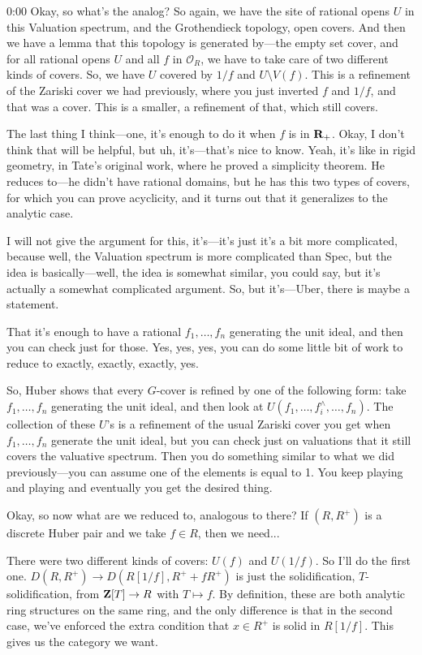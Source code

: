 \begin{unfinished}{0:00}
Okay, so what's the analog? So again, we have the site of rational opens $U$ in this Valuation spectrum, and the Grothendieck topology, open covers. And then we have a lemma that this topology is generated by---the empty set cover, and for all rational opens $U$ and all $f$ in $\mathcal{O}_R$, we have to take care of two different kinds of covers. So, we have $U$ covered by $1/f$ and $U \setminus V(f)$. This is a refinement of the Zariski cover we had previously, where you just inverted $f$ and $1/f$, and that was a cover. This is a smaller, a refinement of that, which still covers.

The last thing I think---one, it's enough to do it when $f$ is in $\mathbf R_+$. Okay, I don't think that will be helpful, but uh, it's---that's nice to know. Yeah, it's like in rigid geometry, in Tate's original work, where he proved a simplicity theorem. He reduces to---he didn't have rational domains, but he has this two types of covers, for which you can prove acyclicity, and it turns out that it generalizes to the analytic case.

I will not give the argument for this, it's---it's just it's a bit more complicated, because well, the Valuation spectrum is more complicated than Spec, but the idea is basically---well, the idea is somewhat similar, you could say, but it's actually a somewhat complicated argument. So, but it's---Uber, there is maybe a statement.

That it's enough to have a rational $f_1, \dots, f_n$ generating the unit ideal, and then you can check just for those. Yes, yes, yes, you can do some little bit of work to reduce to exactly, exactly, exactly, yes.

So, Huber shows that every $G$-cover is refined by one of the following form: take $f_1, \dots, f_n$ generating the unit ideal, and then look at $U(f_1, \dots, f_i^\wedge, \dots, f_n)$. The collection of these $U$'s is a refinement of the usual Zariski cover you get when $f_1, \dots, f_n$ generate the unit ideal, but you can check just on valuations that it still covers the valuative spectrum. Then you do something similar to what we did previously---you can assume one of the elements is equal to 1. You keep playing and playing and eventually you get the desired thing.

Okay, so now what are we reduced to, analogous to there? If $(R, R^+)$ is a discrete Huber pair and we take $f \in R$, then we need...

There were two different kinds of covers: $U(f)$ and $U(1/f)$. So I'll do the first one. $D(R, R^+) \to D(R[1/f], R^+ + fR^+)$ is just the solidification, $T$-solidification, from $\mathbf Z[T] \to R$ with $T \mapsto f$. By definition, these are both analytic ring structures on the same ring, and the only difference is that in the second case, we've enforced the extra condition that $x \in R^+$ is solid in $R[1/f]$. This gives us the category we want.


\end{unfinished}
